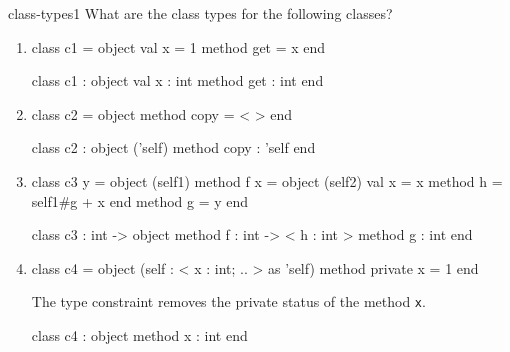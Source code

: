 \exercises

%
\begin{exercise}{class-types1}
What are the class types for the following classes?

\begin{enumerate}
\item

\begin{ocamllisting}
class c1 =
object
   val x = 1
   method get = x
end
\end{ocamllisting}

\begin{answer}\ifanswers
\begin{ocamllisting}
class c1 :
object
   val x : int
   method get : int
end
\end{ocamllisting}
\fi\end{answer}

\item

\begin{ocamllisting}
class c2 =
object
   method copy = {< >}
end
\end{ocamllisting}

\begin{answer}\ifanswers
\begin{ocamllisting}
class c2 :
object ('self)
   method copy : 'self
end
\end{ocamllisting}
\fi\end{answer}

\item

\begin{ocamllisting}
class c3 y =
object (self1)
   method f x =
      object (self2)
         val x = x
         method h = self1#g + x
      end
   method g = y
end
\end{ocamllisting}

\begin{answer}\ifanswers
\begin{ocamllisting}
class c3 : int ->
object
   method f : int -> < h : int >
   method g : int
end
\end{ocamllisting}
\fi\end{answer}

\item

\begin{ocamllisting}
class c4 =
object (self : < x : int; .. > as 'self)
   method private x = 1
end
\end{ocamllisting}

\begin{answer}\ifanswers
The type constraint removes the private status of the method \hbox{\lstinline/x/}.
\begin{ocamllisting}
class c4 :
object 
   method x : int
end
\end{ocamllisting}
\fi\end{answer}
\end{enumerate}
\end{exercise}

